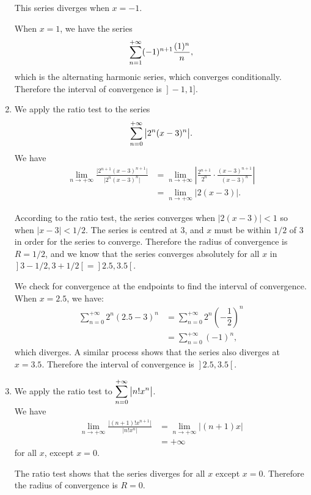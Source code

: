 \begin{example}
\begin{enumerate}
	This series diverges when $x=-1$.
	
	When $x=1$, we have the series $$\displaystyle \sum_{n=1}^{+\infty} (-1)^{n+1}\frac{(1)^n}{n},$$
	which is the alternating harmonic series, which converges conditionally. Therefore the interval of convergence is $\left.\right]-1,1]$.
	
	\item		We apply the ratio test to the series $$\displaystyle\sum_{n=0}^{+\infty} \big|2^n(x-3)^n\big|.$$
	We have
	\begin{align*}
	\lim_{n\to+\infty} \frac{\big| 2^{n+1}(x-3)^{n+1}\big|}{\big|2^n(x-3)^n\big|} &= \lim_{n\to+\infty} \left|\frac{2^{n+1}}{2^n}\cdot\frac{(x-3)^{n+1}}{(x-3)^n}\right|\\
			&=\lim_{n\to+\infty} \big|2(x-3)\big|.
	\end{align*}
	
According to the ratio test, the series converges when $\big|2(x-3)\big|<1$ so when $\big|x-3\big| < 1/2$. The series is centred at 3, and $x$ must be within $1/2$ of 3 in order for the series to converge. Therefore the radius of convergence is $R=1/2$, and we know that the series converges absolutely for all $x$ in $\left.\right]3-1/2,3+1/2\left[\right. = \left.\right]2.5, 3.5\left[\right.$.

We check for convergence at the endpoints to find the interval of convergence. When $x=2.5$, we have:
\begin{align*}
\sum_{n=0}^{+\infty} 2^n(2.5-3)^n &= \sum_{n=0}^{+\infty} 2^n\left(-\dfrac{1}{2}\right)^n \\
			&=\sum_{n=0}^{+\infty} (-1)^n,
\end{align*}
which diverges. A similar process shows that the series also diverges at $x=3.5$. Therefore the interval of convergence is $\left.\right]2.5, 3.5\left[\right.$.

\item	We apply the ratio test to $\displaystyle \sum_{n=0}^{+\infty} \big|n!x^n\big|$. \\
We have
\begin{align*}
\lim_{n\to+\infty} \frac{\big| (n+1)!x^{n+1}\big|}{\big|n!x^n\big|} &= \lim_{n\to+\infty} \big|(n+1)x\big|\\
		&= +\infty
\end{align*}
for all $x$, except $x=0$.


The ratio test shows that the series diverges for all $x$ except $x=0$. Therefore the radius of convergence is $R=0$.
\end{enumerate}
\end{example}


